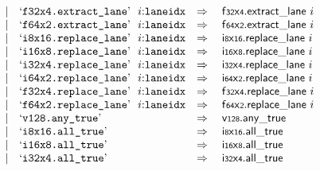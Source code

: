 $$\begin{array}[t]{@{}lrrl@{}l@{}l@{}l@{}}
& & | & \mbox{‘\texttt{f32x4.extract\_lane}’}~~i{:}{\mathtt{laneidx}} & \quad\Rightarrow\quad{} & {\mathsf{f{\scriptstyle 32}}}{\mathsf{x}}{\mathsf{{\scriptstyle 4}}}{.}\mathsf{extract\_lane}~i \\
& & | & \mbox{‘\texttt{f64x2.extract\_lane}’}~~i{:}{\mathtt{laneidx}} & \quad\Rightarrow\quad{} & {\mathsf{f{\scriptstyle 64}}}{\mathsf{x}}{\mathsf{{\scriptstyle 2}}}{.}\mathsf{extract\_lane}~i \\
& & | & \mbox{‘\texttt{i8x16.replace\_lane}’}~~i{:}{\mathtt{laneidx}} & \quad\Rightarrow\quad{} & {\mathsf{i{\scriptstyle 8}}}{\mathsf{x}}{\mathsf{{\scriptstyle 16}}}{.}\mathsf{replace\_lane}~i \\
& & | & \mbox{‘\texttt{i16x8.replace\_lane}’}~~i{:}{\mathtt{laneidx}} & \quad\Rightarrow\quad{} & {\mathsf{i{\scriptstyle 16}}}{\mathsf{x}}{\mathsf{{\scriptstyle 8}}}{.}\mathsf{replace\_lane}~i \\
& & | & \mbox{‘\texttt{i32x4.replace\_lane}’}~~i{:}{\mathtt{laneidx}} & \quad\Rightarrow\quad{} & {\mathsf{i{\scriptstyle 32}}}{\mathsf{x}}{\mathsf{{\scriptstyle 4}}}{.}\mathsf{replace\_lane}~i \\
& & | & \mbox{‘\texttt{i64x2.replace\_lane}’}~~i{:}{\mathtt{laneidx}} & \quad\Rightarrow\quad{} & {\mathsf{i{\scriptstyle 64}}}{\mathsf{x}}{\mathsf{{\scriptstyle 2}}}{.}\mathsf{replace\_lane}~i \\
& & | & \mbox{‘\texttt{f32x4.replace\_lane}’}~~i{:}{\mathtt{laneidx}} & \quad\Rightarrow\quad{} & {\mathsf{f{\scriptstyle 32}}}{\mathsf{x}}{\mathsf{{\scriptstyle 4}}}{.}\mathsf{replace\_lane}~i \\
& & | & \mbox{‘\texttt{f64x2.replace\_lane}’}~~i{:}{\mathtt{laneidx}} & \quad\Rightarrow\quad{} & {\mathsf{f{\scriptstyle 64}}}{\mathsf{x}}{\mathsf{{\scriptstyle 2}}}{.}\mathsf{replace\_lane}~i \\
& & | & \mbox{‘\texttt{v128.any\_true}’} & \quad\Rightarrow\quad{} & \mathsf{v{\scriptstyle 128}} {.} \mathsf{any\_true} \\
& & | & \mbox{‘\texttt{i8x16.all\_true}’} & \quad\Rightarrow\quad{} & {\mathsf{i{\scriptstyle 8}}}{\mathsf{x}}{\mathsf{{\scriptstyle 16}}} {.} \mathsf{all\_true} \\
& & | & \mbox{‘\texttt{i16x8.all\_true}’} & \quad\Rightarrow\quad{} & {\mathsf{i{\scriptstyle 16}}}{\mathsf{x}}{\mathsf{{\scriptstyle 8}}} {.} \mathsf{all\_true} \\
& & | & \mbox{‘\texttt{i32x4.all\_true}’} & \quad\Rightarrow\quad{} & {\mathsf{i{\scriptstyle 32}}}{\mathsf{x}}{\mathsf{{\scriptstyle 4}}} {.} \mathsf{all\_true} \\

\end{array}$$
